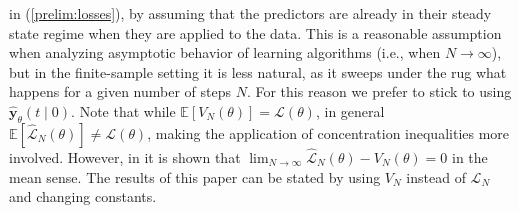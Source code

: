 \documentclass{ifacconf}
\def\eqref#1{(\ref{#1})}
\def\rvw{{\mathbf{w}}}
\def\rvy{{\mathbf{y}}}
\newcommand{\E}{\mathbb{E}}
\begin{document}
in \eqref{prelim:losses}, by assuming that the predictors are already in their steady state regime when they are applied to the data.
This is a reasonable assumption when analyzing asymptotic behavior of learning algorithms (i.e., when $N \rightarrow \infty$), but in the finite-sample setting it is less natural, as it sweeps under the rug what happens for a given number of steps $N$. For this reason we
prefer to stick to using $\hat{\rvy}_{\theta}(t \mid 0)$. 
Note that while $\E[V_N(\theta)]=\mathcal{L}(\theta)$, in general $\E[\hat{\mathcal{L}}_N(\theta)] \ne \mathcal{L}(\theta)$, making the
application of concentration inequalities more involved. However, in \cite{eringis2023pacbayesRNN_OLD} it is shown that
$\lim_{N \rightarrow \infty} \hat{\mathcal{L}}_N(\theta)-V_N(\theta) = 0$ in the mean sense. 
The results of this paper can be stated by using $V_N$ instead of $\mathcal{L}_N$ and changing constants. %

\end{document}

